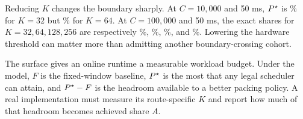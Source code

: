 Reducing $K$ changes the boundary sharply. At $C=10{,}000$ and 50 ms,
$P^\star$ is \TracePAtTenKThirtyTwoPct\% for $K=32$ but
\TracePAtTenKSixtyFourPct\% for $K=64$. At $C=100{,}000$ and 50 ms, the exact
shares for $K=32,64,128,256$ are respectively
\TracePAtHundredKThirtyTwoPct\%, \TracePAtHundredKSixtyFourPct\%,
\TracePAtHundredKOneTwentyEightPct\%, and
\TracePAtHundredKTwoFiftySixPct\%. Lowering the hardware threshold can matter
more than admitting another boundary-crossing cohort.

The surface gives an online runtime a measurable workload budget. Under the
model, $F$ is the fixed-window baseline, $P^\star$ is the most that any legal
scheduler can attain, and $P^\star-F$ is the headroom available to a better
packing policy. A real implementation must measure its route-specific $K$ and
report how much of that headroom becomes achieved share $A$.
